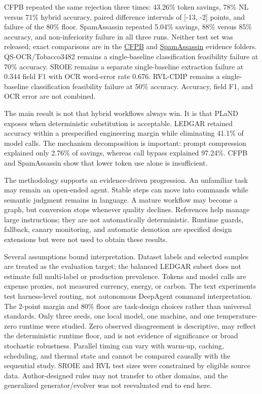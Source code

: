 \documentclass[9pt,a4paper,twocolumn]{article}
\makeatletter
\renewcommand\section{\@startsection{section}{1}{0pt}{0.7ex}{0.25ex}{\color{headingblue}\normalfont\large}}
\makeatother
\begin{document}
CFPB repeated the same rejection three times: 43.26\% token savings, 78\% NL versus 71\% hybrid accuracy, paired difference intervals of [-13, -2] points, and failure of the 80\% floor. SpamAssassin repeated 5.04\% savings, 88\% versus 85\% accuracy, and non-inferiority failure in all three runs. Neither test set was released; exact comparisons are in the \href{https://github.com/mnvsk97/PLaND/tree/codex/pland-variance-study/experiments/cfpb-text-classification/results/variance-study-20260903}{CFPB} and \href{https://github.com/mnvsk97/PLaND/tree/codex/pland-variance-study/experiments/spamassassin-email-classification/results/variance-study-20260903}{SpamAssassin} evidence folders. QS-OCR/Tobacco3482 remains a single-baseline classification feasibility failure at 70\% accuracy. SROIE remains a separate single-baseline extraction failure at 0.344 field F1 with OCR word-error rate 0.676. RVL-CDIP remains a single-baseline classification feasibility failure at 50\% accuracy. Accuracy, field F1, and OCR error are not combined.

\section{Discussion}
The main result is not that hybrid workflows always win. It is that PLaND exposes when deterministic substitution is acceptable. LEDGAR retained accuracy within a prespecified engineering margin while eliminating 41.1\% of model calls. The mechanism decomposition is important: prompt compression explained only 2.76\% of savings, whereas call bypass explained 97.24\%. CFPB and SpamAssassin show that lower token use alone is insufficient.

The methodology supports an evidence-driven progression. An unfamiliar task may remain an open-ended agent. Stable steps can move into commands while semantic judgment remains in language. A mature workflow may become a graph, but conversion stops whenever quality declines. References help manage large instructions; they are not automatically deterministic. Runtime guards, fallback, canary monitoring, and automatic demotion are specified design extensions but were not used to obtain these results.

Several assumptions bound interpretation. Dataset labels and selected samples are treated as the evaluation target; the balanced LEDGAR subset does not estimate full multi-label or production prevalence. Tokens and model calls are expense proxies, not measured currency, energy, or carbon. The text experiments test harness-level routing, not autonomous DeepAgent command interpretation. The 2-point margin and 80\% floor are task-design choices rather than universal standards. Only three seeds, one local model, one machine, and one temperature-zero runtime were studied. Zero observed disagreement is descriptive, may reflect the deterministic runtime floor, and is not evidence of significance or broad stochastic robustness. Parallel timing can vary with warm-up, caching, scheduling, and thermal state and cannot be compared causally with the sequential study. SROIE and RVL test sizes were constrained by eligible source data. Author-designed rules may not transfer to other domains, and the generalized generator/evolver was not reevaluated end to end here.
\end{document}
